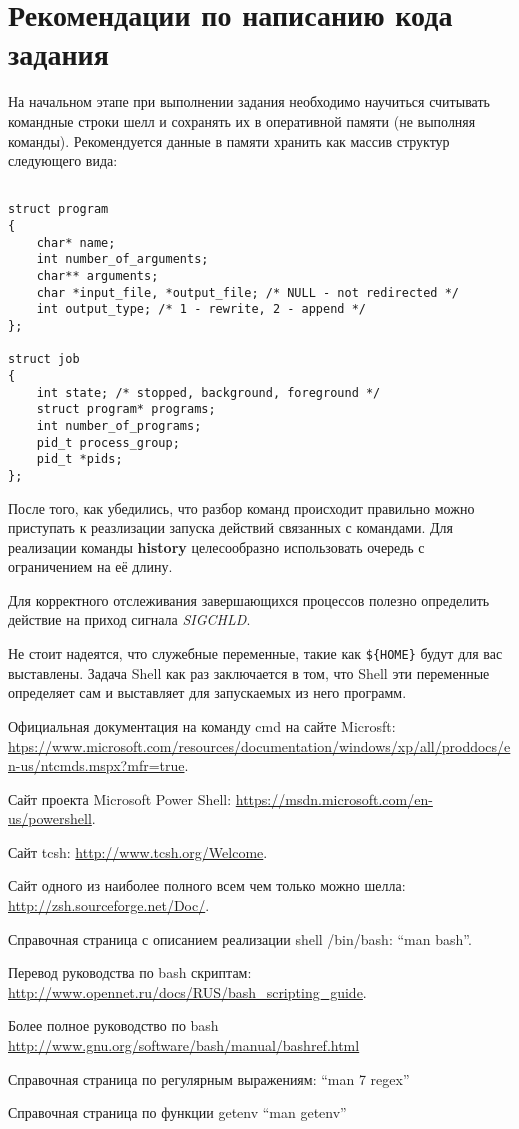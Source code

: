 \documentclass[11pt, a4paper]{article}
\begin{document}
\newpage
\section{Рекомендации по написанию кода задания}

На начальном этапе при выполнении задания необходимо научиться считывать командные строки 
шелл и сохранять их в оперативной памяти (не выполняя команды). 
Рекомендуется данные в памяти хранить как массив структур следующего вида:

\begin{lstlisting}

struct program
{
    char* name;
    int number_of_arguments;
    char** arguments;
    char *input_file, *output_file; /* NULL - not redirected */
    int output_type; /* 1 - rewrite, 2 - append */
};

struct job
{
    int state; /* stopped, background, foreground */
    struct program* programs;
    int number_of_programs;
    pid_t process_group;
    pid_t *pids;
};

\end{lstlisting}

После того, как убедились, что разбор команд происходит правильно можно приступать к 
реазлизации запуска действий связанных с командами.
Для реализации команды \textbf{history}
целесообразно использовать очередь с ограничением на её длину. 

Для корректного отслеживания завершающихся процессов полезно определить действие на приход 
сигнала \textit{SIGCHLD}.

Не стоит надеятся, что служебные переменные, такие как \verb#${HOME}#  будут для вас выставлены.
Задача Shell как раз заключается в том, что Shell эти переменные определяет сам и выставляет для 
запускаемых из него программ.


\begin{thebibliography}{50}
    Официальная документация на команду cmd на сайте Microsft:
    \url{htps://www.microsoft.com/resources/documentation/windows/xp/all/proddocs/en-us/ntcmds.mspx?mfr=true}.

    Сайт проекта Microsoft Power Shell:  \url{https://msdn.microsoft.com/en-us/powershell}.

    Сайт tcsh: \url{http://www.tcsh.org/Welcome}.

    Сайт одного из наиболее полного всем чем только можно шелла:
    \url{http://zsh.sourceforge.net/Doc/}.

    Справочная страница с описанием реализации shell /bin/bash: ``man bash''.

    Перевод руководства по bash скриптам: \url{http://www.opennet.ru/docs/RUS/bash\_scripting\_guide}.

    Более полное руководство по bash \url{http://www.gnu.org/software/bash/manual/bashref.html}
    
    Справочная страница по регулярным выражениям: ``man 7 regex''

    Справочная страница по функции getenv ``man getenv''

\end{thebibliography}
\end{document}
